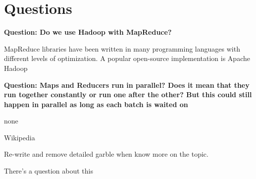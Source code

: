\documentclass[11pt]{article}
\newcommand{\question}[2] {
  \textbf{Question: #1}
  \begin{center} #2
\end{center}
}
\begin{document}
\section{Questions}

\question{Do we use Hadoop with MapReduce?}{MapReduce libraries have been written in many programming languages with different levels of optimization. A popular open-source implementation is Apache Hadoop \cite{wiki}}

\question{Maps and Reducers run in parallel? Does it mean that they run together constantly or run one after the other? But this could still happen in parallel as long as each batch is waited on}{none}

\begin{thebibliography}{9}

Wikipedia

Re-write and remove detailed garble when know more on the topic.

There's a question about this

\end{thebibliography}
\end{document}
